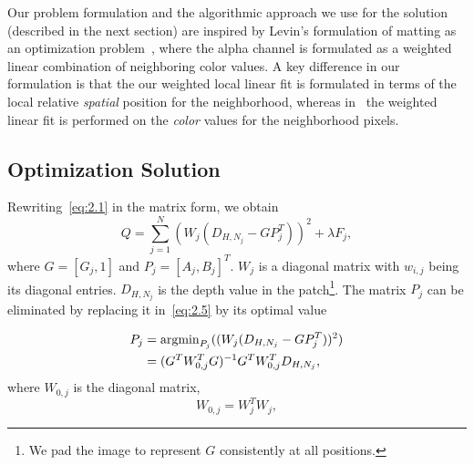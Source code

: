 Our problem formulation and the algorithmic approach we use for the solution (described in the next section) are inspired by Levin's formulation of matting as an optimization problem~\cite{levin2008closed}, where the alpha channel is formulated as a weighted linear combination of neighboring color values. A key difference in our formulation is that the our weighted local linear fit is formulated in terms of the local relative {\em spatial} position for the neighborhood, whereas in~\cite{levin2008closed} the weighted linear fit is performed on the {\em color} values for the neighborhood pixels. 

\subsection{Optimization Solution}
\label{sec2.3.2}
Rewriting~\eqref{eq:2.1} in the matrix form, we obtain
\begin{equation}
Q = \sum_{j=1}^{N}{(W_{j}(D_{H,N_{j}}-GP_{j}^T))^2+{\lambda}F_{j}},
\label{eq:2.5}
\end{equation}
where $G = [G_j,1]$ and $P_{j} = [A_{j},B_{j}]^T$. $W_{j}$ is a diagonal matrix with $w_{i,j}$ being its diagonal entries. $D_{H,N_{j}}$ is the depth value in the patch\footnote{We pad the image to represent $G$ consistently at all positions.}. The matrix $P_{j}$ can be eliminated by replacing it in~\eqref{eq:2.5} by its optimal value 

\begin{equation}
\label{eq:2.6}
\begin{split}
P_{j} &=  {\operatorname*{argmin}}_{P_{j}}{((W_{j}(D_{H,N_{j}}-GP_{j}^T))^2)}\\
&= (G^{T}W_{0,j}^{T}G)^{-1}G^{T}W_{0,j}^{T}D_{H,N_{j}},
\end{split}
\end{equation}
where $W_{0,j}$ is the diagonal matrix,
\begin{equation}
W_{0,j} = W_{j}^{T}W_{j},
\end{equation}


